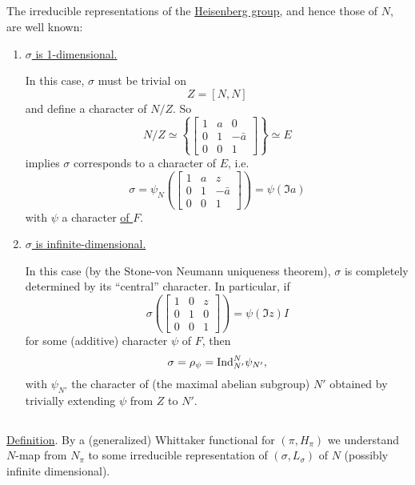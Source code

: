 \subsection{}
\label{sec:1.2}
The irreducible representations of the \underline{Heisenberg group}, and hence those of $N$, are well known:
\begin{enumerate}[label=(\roman*)]
    \item \underline{$\sigma$ is 1-dimensional.} 
    
    In this case, $\sigma$ must be trivial on 
    \[
        Z = [N, N]
    \]
    and define a character of $N/Z$. So
    \[
        N/Z \simeq \left\{\begin{bmatrix} 1 & a & 0 \\ 0 & 1 & -\bar{a} \\ 0 & 0 & 1 \end{bmatrix}\right\} \simeq E
    \]
    implies $\sigma$ corresponds to a character of $E$, i.e.
    \[
        \sigma = \psi_N\left(\begin{bmatrix}
            1 & a & z \\ 0 & 1 & -\bar{a} \\ 0 & 0 & 1
        \end{bmatrix}\right) = \psi(\Im a)
    \]
    with $\psi$ a character \underline{of $F$}.
    \item \underline{$\sigma$ is infinite-dimensional.}
    
    In this case (by the Stone-von Neumann uniqueness theorem), $\sigma$ is completely determined by its ``central'' character. In particular, if
    \[
        \sigma\left(\begin{bmatrix}
            1 & 0 & z \\ 0 & 1 & 0 \\ 0 & 0 & 1
        \end{bmatrix}\right) = \psi(\Im z) I
    \]
    for some (additive) character $\psi$ of $F$, then
    \[
        \sigma = \rho_\psi = \mathrm{Ind}_{N'}^{N} \psi_{N'},
    \]
    with $\psi_{N'}$ the character of (the maximal abelian subgroup) $N'$ obtained by trivially extending $\psi$ from $Z$ to $N'$.
\end{enumerate}


\subsection{}
\label{sec:1.3}


\underline{Definition}. By a (generalized) Whittaker functional for $(\pi, H_\pi)$ we understand $N$-map from $N_\pi$ to some irreducible representation of $(\sigma, L_\sigma)$ of $N$ (possibly infinite dimensional).



